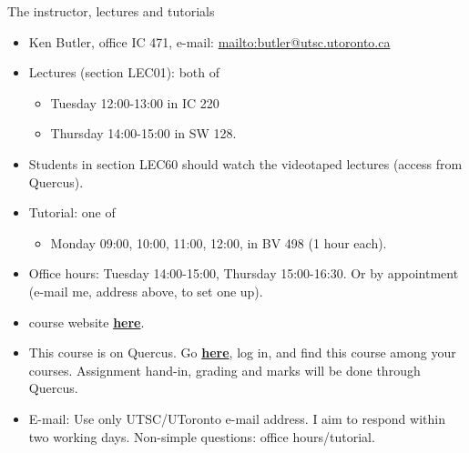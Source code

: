 \documentclass[
  ignorenonframetext,
]{beamer}
\providecommand{\tightlist}{%
  \setlength{\itemsep}{0pt}\setlength{\parskip}{0pt}}
\begin{document}
\begin{frame}{The instructor, lectures and tutorials}
\protect\hypertarget{the-instructor-lectures-and-tutorials}{}

\begin{itemize}
\tightlist
\item
  Ken Butler, office IC 471, e-mail:
  \url{mailto:butler@utsc.utoronto.ca}
\item
  Lectures (section LEC01): both of

  \begin{itemize}
  \tightlist
  \item
    Tuesday 12:00-13:00 in IC 220
  \item
    Thursday 14:00-15:00 in SW 128.
  \end{itemize}
\item
  Students in section LEC60 should watch the videotaped lectures (access
  from Quercus).
\item
  Tutorial: one of

  \begin{itemize}
  \tightlist
  \item
    Monday 09:00, 10:00, 11:00, 12:00, in BV 498 (1 hour each).
  \end{itemize}
\item
  Office hours: Tuesday 14:00-15:00, Thursday 15:00-16:30. Or by
  appointment (e-mail me, address above, to set one up).
\item
  course website \href{http://ritsokiguess.site/STAC33}{\textbf{here}}.
\item
  This course is on Quercus. Go
  \href{http://q.utoronto.ca}{\textbf{here}}, log in, and find this
  course among your courses. Assignment hand-in, grading and marks will
  be done through Quercus.
\item
  E-mail: Use only UTSC/UToronto e-mail address. I aim to respond within
  two working days. Non-simple questions: office hours/tutorial.
\end{itemize}

\end{frame}
\end{document}
